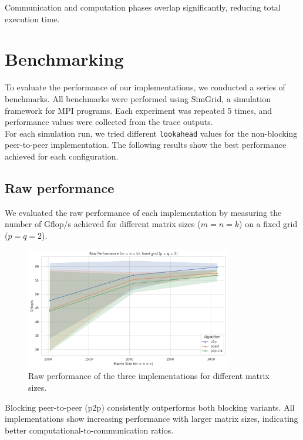 \documentclass[12pt,a4paper]{article}
\begin{document}
Communication and computation phases overlap significantly, reducing total execution time.



\section{Benchmarking}

To evaluate the performance of our implementations, we conducted a series of benchmarks.
All benchmarks were performed using SimGrid, a simulation framework for MPI programs.
Each experiment was repeated 5 times, and performance values were collected from the trace outputs. \\
For each simulation run, we tried different \texttt{lookahead} values for the non-blocking peer-to-peer implementation.
The following results show the best performance achieved for each configuration.

\subsection{Raw performance}

We evaluated the raw performance of each implementation by measuring the number of Gflop/s achieved for different matrix sizes (\(m = n = k\)) on a fixed grid (\(p = q = 2\)).

\begin{figure}[H]
    \centering
    \includegraphics[width=0.8\textwidth]{src/raw_performance.png}
    \caption{Raw performance of the three implementations for different matrix sizes.}
    \label{fig:raw_performance}        
\end{figure}

Blocking peer-to-peer (p2p) consistently outperforms both blocking variants.
All implementations show increasing performance with larger matrix sizes, indicating better computational-to-communication ratios.
\end{document}
